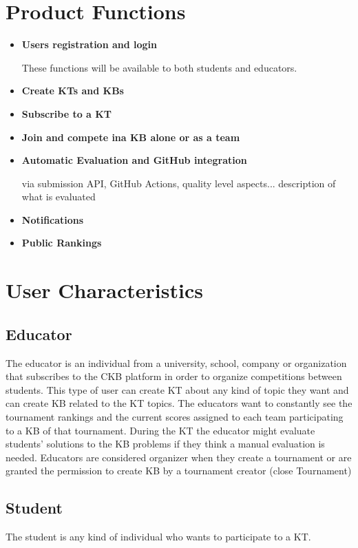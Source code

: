 \documentclass[11pt]{report}
\begin{document}
\section{Product Functions}
\begin{itemize}
    \item \textbf{Users registration and login}
    
    These functions will be available to both students and educators.

    \item \textbf{Create KTs and KBs}


    \item \textbf{Subscribe to a KT}
    \item \textbf{Join and compete ina KB alone or as a team}
    \item \textbf{Automatic Evaluation and GitHub integration}

    via submission API, GitHub Actions, quality level aspects... description of what is evaluated

    \item \textbf{Notifications}
    \item \textbf{Public Rankings}
\end{itemize}

\section{User Characteristics}
\subsection{Educator}
The educator is an individual from a university, school, company
or organization that subscribes to the CKB platform in order to organize
competitions between students. This type of user can create KT about any
kind of topic they want and can create KB related to the KT topics. The
educators want to constantly see the tournament rankings and the current
scores assigned to each team participating to a KB of that tournament.
During the KT the educator might evaluate students’ solutions to the KB
problems if they think a manual evaluation is needed.
Educators are considered organizer when they create a tournament or are
granted the permission to create KB by a tournament creator (close
Tournament)
\subsection{Student}
The student is any kind of individual who wants to participate to a KT. 
\end{document}
